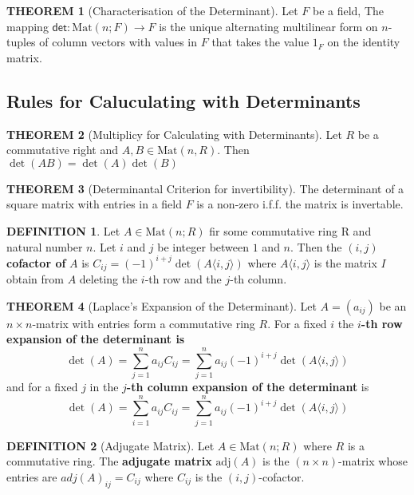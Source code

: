 \documentclass[12pt]{article}
\theoremstyle{definition}
\newtheorem{definition}{DEFINITION}[subsection]
\newtheorem{theorem}{THEOREM}[subsection]
\newcommand{\Mat}{\text{Mat}}
\newcommand{\adj}{\text{adj}}
\begin{document}
\begin{theorem}[Characterisation of the Determinant]
    Let $F$ be a field, The mapping $\mathsf{det}: \Mat(n;F) \rightarrow F$ is the unique alternating multilinear form on $n$-tuples of column vectors with values in $F$ that takes the value $1_F$ on the identity matrix.
\end{theorem}

\subsection{Rules for Caluculating with Determinants}
\begin{theorem}[Multiplicy for Calculating with Determinants]
    Let $R$ be a commutative right and $A,B \in \Mat(n,R)$. Then $\det(AB) = \det(A)\det(B)$
\end{theorem}

\begin{theorem}[Determinantal Criterion for invertibility]
    The determinant of a square matrix with entries in a field $F$ is a non-zero i.f.f. the matrix is invertable.
\end{theorem}

\begin{definition}
    Let $A\in \Mat(n;R)$ fir some commutative ring R and natural number $n$. Let $i$ and $j$ be integer between $1$ and $n$. Then the $(i,j)$ \textbf{cofactor of} $A$ is $C_{ij} = (-1)^{i+j}\det(A\langle i,j\rangle)$ where $A\langle i,j\rangle$ is the matrix $I$ obtain from $A$ deleting the $i$-th row and the $j$-th column.
\end{definition}

\begin{theorem}[Laplace's Expansion of the Determinant]
    Let $A = (a_{ij})$ be an $n\times n$-matrix with entries form a commutative ring $R$. For a fixed $i$ the \textbf{$i$-th row expansion of the determinant is}
    $$\det(A) = \sum_{j=1}^n a_{ij}C_{ij} = \sum_{j=1}^{n} a_{ij}(-1)^{i+j}\det(A\langle i,j\rangle)$$
    and for a fixed $j$ in the \textbf{$j$-th column expansion of the determinant} is
    $$\det(A) = \sum_{i=1}^n a_{ij}C_{ij} = \sum_{j=1}^{n} a_{ij}(-1)^{i+j}\det(A\langle i,j\rangle)$$
\end{theorem}

\begin{definition}[Adjugate Matrix]
    Let $A\in \Mat(n;R)$ where $R$ is a commutative ring. The \textbf{adjugate matrix} $\adj(A)$ is the $(n \times n)$-matrix whose entries are $adj(A)_{ij} = C_{ij}$ where $C_{ij}$ is the $(i,j)$-cofactor.
\end{definition}
\end{document}
